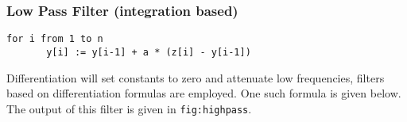 \hypertarget{low-pass-filter-integration-based}{%
\subsubsection{Low Pass Filter (integration
based)}\label{low-pass-filter-integration-based}}

\begin{verbatim}
for i from 1 to n
       y[i] := y[i-1] + a * (z[i] - y[i-1])
\end{verbatim}

\begin{Shaded}
\begin{Highlighting}[]
 \OperatorTok{,}

\OperatorTok{=} 
\OperatorTok{=} 
\OperatorTok{=}\OperatorTok{,}
\OperatorTok{=}\OperatorTok{,}

\OperatorTok{=}\OperatorTok{,}\OperatorTok{,}\OperatorTok{=}
\OperatorTok{=}
\OperatorTok{=}\OperatorTok{+}
\OperatorTok{=}

\NormalTok{y[}\NormalTok{] }\OperatorTok{=}\NormalTok{ z[}\NormalTok{]}
\OperatorTok{=} \OperatorTok{:}
\OperatorTok{=}\OperatorTok{+} \OperatorTok{*}\OperatorTok{{-}}








\OperatorTok{,}






\OperatorTok{,}
\end{Highlighting}
\end{Shaded}

Differentiation will set constants to zero and attenuate low
frequencies, filters based on differentiation formulas are employed. One
such formula is given below. The output of this filter is given in
\texttt{fig:highpass}.

